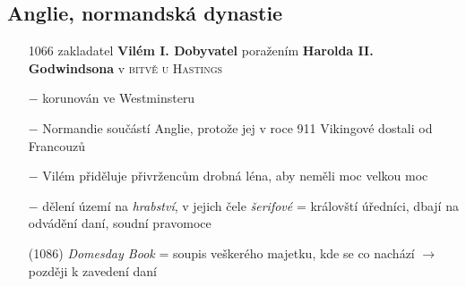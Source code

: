 \documentclass{article}
\begin{document}
\subsection*{Anglie, normandská dynastie}
\begin{itemize}
    \vspace{-0.5em}
    \setlength\itemsep{0.15em}
    \item[1066] zakladatel \textbf{Vilém I. Dobyvatel} poražením \textbf{Harolda II. Godwindsona} v \textsc{bitvě u Hastings}
    \item[$-$] korunován ve Westminsteru
    \item[$-$] Normandie součástí Anglie, protože jej v roce 911 Vikingové dostali od Francouzů
    \item[$-$] Vilém přiděluje přivržencům drobná léna, aby neměli moc velkou moc
    \item[$-$] dělení území na \textit{hrabství}, v jejich čele \textit{šerifové} = královští úředníci, dbají na odvádění daní, soudní pravomoce
    \item[(1086)] \textit{Domesday Book} = soupis veškerého majetku, kde se co nachází $\rightarrow$ později k zavedení daní
\end{itemize}
\end{document}
